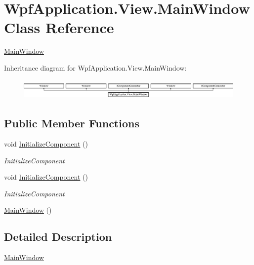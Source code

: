 \hypertarget{class_wpf_application_1_1_view_1_1_main_window}{\section{Wpf\-Application.\-View.\-Main\-Window Class Reference}
\label{class_wpf_application_1_1_view_1_1_main_window}
}


\hyperlink{class_wpf_application_1_1_view_1_1_main_window}{Main\-Window}  


Inheritance diagram for Wpf\-Application.\-View.\-Main\-Window\-:\begin{figure}[H]
\begin{center}
\leavevmode
\includegraphics[height=1.051643cm]{class_wpf_application_1_1_view_1_1_main_window}
\end{center}
\end{figure}
\subsection*{Public Member Functions}
\begin{DoxyCompactItemize}
\item 
void \hyperlink{class_wpf_application_1_1_view_1_1_main_window_ada989bc9473ea0dfba99c402b94cf87d}{Initialize\-Component} ()
\begin{DoxyCompactList}\small\item\em Initialize\-Component \end{DoxyCompactList}\item 
void \hyperlink{class_wpf_application_1_1_view_1_1_main_window_ada989bc9473ea0dfba99c402b94cf87d}{Initialize\-Component} ()
\begin{DoxyCompactList}\small\item\em Initialize\-Component \end{DoxyCompactList}\item 
\hyperlink{class_wpf_application_1_1_view_1_1_main_window_ac2710c7546972b854e654ae059643e66}{Main\-Window} ()
\end{DoxyCompactItemize}


\subsection{Detailed Description}
\hyperlink{class_wpf_application_1_1_view_1_1_main_window}{Main\-Window} 

